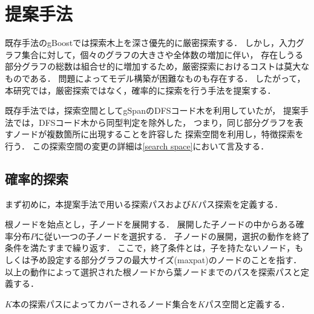 \chapter{提案手法}
既存手法のgBoostでは探索木上を深さ優先的に厳密探索する．
しかし，入力グラフ集合に対して，個々のグラフの大きさや全体数の増加に伴い，
存在しうる部分グラフの総数は組合せ的に増加するため，厳密探索におけるコストは莫大なものである．
問題によってモデル構築が困難なものも存在する．
したがって，本研究では，厳密探索ではなく，確率的に探索を行う手法を提案する．

既存手法では，探索空間としてgSpan\cite{gSpan}のDFSコード木を利用していたが，
提案手法では，DFSコード木から同型判定を除外した，
つまり，同じ部分グラフを表すノードが複数箇所に出現することを許容した
探索空間を利用し，特徴探索を行う．
この探索空間の変更の詳細は\ref{search space}において言及する．

\section{確率的探索}
まず初めに，本提案手法で用いる探索パスおよび$K$パス探索を定義する．
\begin{Definition}[探索パス]
	根ノードを始点とし，子ノードを展開する．
	展開した子ノードの中からある確率分布$P$に従い一つの子ノードを選択する．
	子ノードの展開，選択の動作を終了条件を満たすまで繰り返す．
	ここで，終了条件とは，子を持たないノード，もしくは予め設定する部分グラフの最大サイズ(maxpat)のノードのことを指す．
	以上の動作によって選択された根ノードから葉ノードまでのパスを探索パスと定義する．
\end{Definition}
\begin{Definition}[$K$パス空間]
	$K$本の探索パスによってカバーされるノード集合を$K$パス空間と定義する．
\end{Definition}

